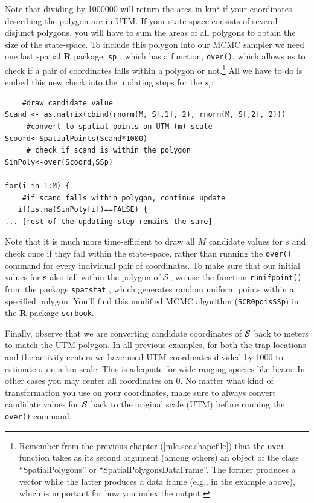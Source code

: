  Note that dividing by 1000000 will return the area in km$^2$ if your coordinates describing the polygon are in UTM. If your state-space consists of several disjunct polygons, you will have to sum the areas of all polygons to obtain the size of the state-space.
To include this polygon into our MCMC sampler we need one last spatial
{\bf R} package, \mbox{\tt sp} \citep{pebesma_bivand:2011}, which has a
function, \verb#over()#, which allows us to check if a pair of coordinates
falls within a polygon or not.\footnote{Remember from the previous chapter (\ref{mle.sec.shapefile}) that the {\tt over} function takes as its second argument (among others) an object of the class ``SpatialPolygons'' or ``SpatialPolygonsDataFrame''. The former produces a vector while the latter produces a data frame (e.g., in the example above), which is important for how you index the output.} All we have to do is embed this new check
into the updating steps for the $s_i$:
\begin{verbatim}
    #draw candidate value
Scand <- as.matrix(cbind(rnorm(M, S[,1], 2), rnorm(M, S[,2], 2)))
     #convert to spatial points on UTM (m) scale
Scoord<-SpatialPoints(Scand*1000)
     # check if scand is within the polygon
SinPoly<-over(Scoord,SSp)

for(i in 1:M) {
    #if scand falls within polygon, continue update
   if(is.na(SinPoly[i])==FALSE) {
... [rest of the updating step remains the same]
\end{verbatim}
Note that it is much more time-efficient to draw all $M$ candidate values
for {\bf $s$} and check once if they fall within the state-space, rather than
running the \verb#over()# command for every individual pair of
coordinates. To make sure that our initial values for {\bf s} also fall
within the polygon of ${\cal S}$, we use the function \verb#runifpoint()#
from the package \mbox{\tt spatstat} \citep{baddeley_turner:2005},
which generates random uniform points within a specified polygon. You'll
find this modified MCMC algorithm (\mbox{\tt SCR0poisSSp}) in the {\bf R}
package \mbox{\tt scrbook}.

Finally, observe that we are converting candidate coordinates of ${\cal S}$
back to meters to match the UTM polygon. In all previous examples,
for both the trap locations and the activity centers we have used UTM
coordinates divided by 1000 to estimate $\sigma$ on a km scale. This is
adequate for wide ranging species like bears. In other cases you
may center all coordinates on 0. No matter what kind of transformation you
use on your coordinates, make sure to always convert candidate values for
${\cal S}$ back to the original scale (UTM) before running the
\verb#over()# command.

